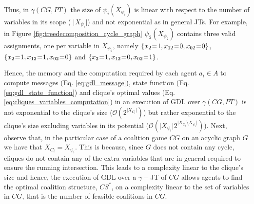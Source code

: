 \documentclass{aamas2012}
\begin{document}
Thus, in $\gamma(CG,PT)$ the size of $\psi_i(X_{\psi_i})$ is linear with
respect to the number of variables in its scope ( $\vert X_{\psi_i}\vert$) and
not exponential as in general JTs. For example, in Figure
\ref{fig:treedecomposition_cycle_graph} $\psi_2(X_{\psi_2})$ contains three
valid assignments, one per variable in $X_{\psi_2}$, namely
\small$\{x_2\hspace{-0.03in}=\hspace{-0.03in}1,x_{12}\hspace{-0.03in}=\hspace{-0.03in}0,x_{02}\hspace{-0.03in}=\hspace{-0.03in}0\}$\normalsize,\small$\{x_2\hspace{-0.03in}=\hspace{-0.03in}1,x_{12}\hspace{-0.03in}=\hspace{-0.03in}1,x_{02}\hspace{-0.03in}=\hspace{-0.03in}0\}$\normalsize
and
\small$\{x_2\hspace{-0.03in}=\hspace{-0.03in}1,x_{12}\hspace{-0.03in}=\hspace{-0.03in}0,x_{02}\hspace{-0.03in}=\hspace{-0.03in}1\}$\normalsize.

Hence, the memory and the computation required by each agent $a_i\in A$ to
compute messages (Eq. \ref{eq:gdl_message}), state function (Eq.
\ref{eq:gdl_state_function}) and clique's optimal values (Eq.
\ref{eq:cliques_variables_computation}) in an execution of GDL over $\gamma(CG,
PT)$ is not exponential to the clique's size ($\mathcal{O}(2^{\vert
X_{C_i}\vert})$) but rather exponential to the clique's size excluding variables
in its potential ($\mathcal{O}(\vert X_{\psi_i}\vert 2^{\vert X_{C_i} \setminus
X_{\psi_i}\vert})$). Next, observe that, in the particular case of a coalition
game $CG$ on an acyclic graph $G$ we have that $X_{C_i} = X_{\psi_i}$. This is
because, since $G$ does not contain any cycle, cliques do
not contain any of the extra variables that are in general required to ensure the
running intersection. This leads to a complexity linear to the clique's
size and hence, the execution of GDL over a $\gamma-$JT of $CG$
allows agents to find the optimal coalition structure, $CS^*$, on a complexity
linear to the set of variables in $CG$, that is the number of feasible
coalitions in $CG$.
\end{document}
